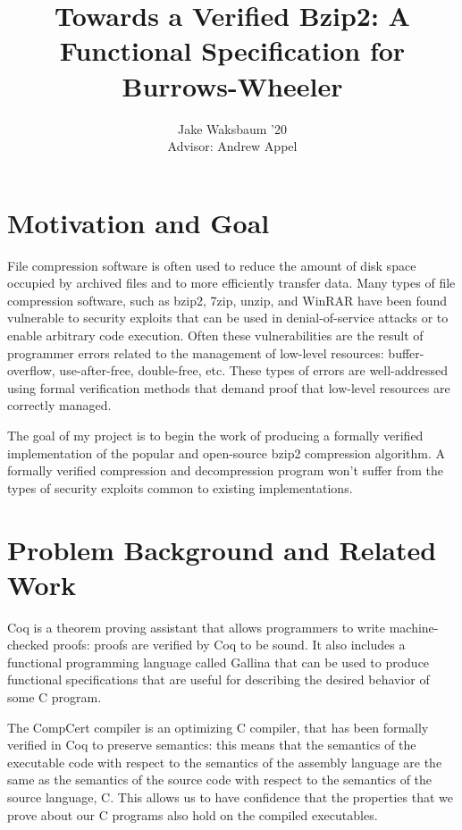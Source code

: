 \documentclass{article}
\title{Towards a Verified Bzip2: A Functional Specification for Burrows-Wheeler}
\author{Jake Waksbaum '20\\Advisor: Andrew Appel}
\date{}
\begin{document}
\maketitle

\section{Motivation and Goal}
File compression software is often used to reduce the amount of disk
space occupied by archived files and to more efficiently transfer
data. Many types of file compression software, such as
bzip2\cite{bzip2}, 7zip\cite{7zip}, unzip\cite{infozip}, and
WinRAR\cite{winrar} have been found vulnerable to security exploits
that can be used in denial-of-service attacks or to enable arbitrary
code execution. Often these vulnerabilities are the result of
programmer errors related to the management of low-level resources:
buffer-overflow, use-after-free, double-free, etc. These types of
errors are well-addressed using formal verification methods that
demand proof that low-level resources are correctly managed.

The goal of my project is to begin the work of producing a formally
verified implementation of the popular and open-source bzip2
compression algorithm. A formally verified compression and
decompression program won't suffer from the types of security exploits
common to existing implementations.

\section{Problem Background and Related Work}
Coq is a theorem proving assistant that allows programmers to write
machine-checked proofs: proofs are verified by Coq to be sound. It
also includes a functional programming language called Gallina that
can be used to produce functional specifications\cite{7536361} that
are useful for describing the desired behavior of some C program.

The CompCert
compiler\cite{Stewart:2015:CC:2676726.2676985,leroy:inria-00000963} is
an optimizing C compiler, that has been formally verified in Coq to
preserve semantics: this means that the semantics of the executable
code with respect to the semantics of the assembly language are the
same as the semantics of the source code with respect to the semantics
of the source language, C. This allows us to have confidence that the
properties that we prove about our C programs also hold on the
compiled executables.
\end{document}
